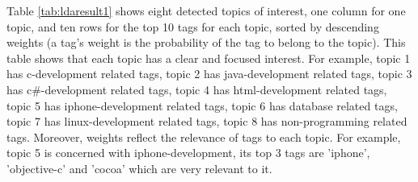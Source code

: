 Table \ref{tab:ldaresult1} shows eight detected topics of interest, one column for one topic, and ten rows for the top 10 tags for each topic, sorted by descending weights (a tag's weight is the probability of the tag to belong to the topic).  
This table shows that each topic has a clear and focused interest. For example, topic 1 has c-development related tags, topic 2 has java-development related tags, topic 3 has c\#-development related tags, topic 4 has html-development related tags, topic 5 has iphone-development related tags, topic 6 has database related tags, topic 7 has linux-development related tags, topic 8 has non-programming related tags. 
Moreover, weights reflect the relevance of tags to each topic. For example, topic 5 is concerned with iphone-development, its top 3 tags are 'iphone', 'objective-c' and 'cocoa' which are very relevant to it.

